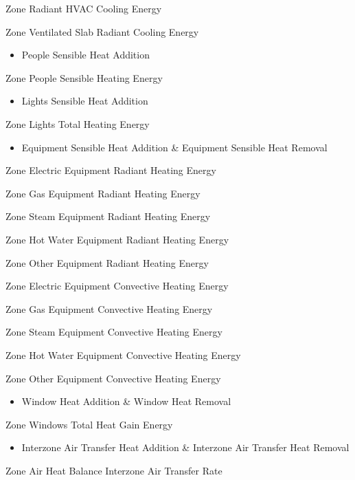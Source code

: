 Zone Radiant HVAC Cooling Energy

Zone Ventilated Slab Radiant Cooling Energy

\begin{itemize}
\tightlist
\item
  People Sensible Heat Addition
\end{itemize}

Zone People Sensible Heating Energy

\begin{itemize}
\tightlist
\item
  Lights Sensible Heat Addition
\end{itemize}

Zone Lights Total Heating Energy

\begin{itemize}
\tightlist
\item
  Equipment Sensible Heat Addition \& Equipment Sensible Heat Removal
\end{itemize}

Zone Electric Equipment Radiant Heating Energy

Zone Gas Equipment Radiant Heating Energy

Zone Steam Equipment Radiant Heating Energy

Zone Hot Water Equipment Radiant Heating Energy

Zone Other Equipment Radiant Heating Energy

Zone Electric Equipment Convective Heating Energy

Zone Gas Equipment Convective Heating Energy

Zone Steam Equipment Convective Heating Energy

Zone Hot Water Equipment Convective Heating Energy

Zone Other Equipment Convective Heating Energy

\begin{itemize}
\tightlist
\item
  Window Heat Addition \& Window Heat Removal
\end{itemize}

Zone Windows Total Heat Gain Energy

\begin{itemize}
\tightlist
\item
  Interzone Air Transfer Heat Addition \& Interzone Air Transfer Heat Removal
\end{itemize}

Zone Air Heat Balance Interzone Air Transfer Rate

